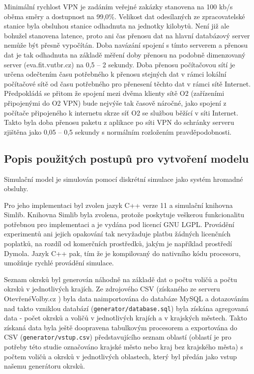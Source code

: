 \documentclass[12pt,a4paper,titlepage,final]{article}
\begin{document}
Minimální rychlost VPN je zadáním veřejné zakázky stanovena na 100 kb/s oběma směry a dostupnost na 99,0\%. \cite{ezak-czso} Velikost dat odesílaných ze zpracovatelské stanice byla obsluhou stanice odhadnuta na jednotky kilobytů. Není již ale bohužel stanovena latence, proto ani čas přenosu dat na hlavní databázový server nemůže být přesně vypočítán. Doba navázání spojení s tímto serverem a přenosu dat je tak odhadnuta na základě měření doby přenosu na podobně dimenzovaný server (eva.fit.vutbr.cz) na 0,5 -- 2 sekundy. Doba přenosu počítačovou sítí je určena odečtením času potřebného k přenosu stejných dat v rámci lokální počítačové sítě od času potřebného pro přenesení těchto dat v rámci sítě Internet. Předpokládá se přitom že spojení mezi dvěma klienty sítě O2 (zařízeními připojenými do O2 VPN) bude nejvýše tak časově náročné, jako spojení z počítače připojeného k internetu skrze síť O2 se službou běžící v síti Internet. Takto byla doba přenosu paketu z aplikace po síti VPN do schránky serveru zjištěna jako 0,05 -- 0,5 sekundy s normálním rozložením pravděpodobnosti.

\subsection{Popis použitých postupů pro vytvoření modelu}

Simulační model \cite[str. 10]{ims} je simulován pomocí diskrétní simulace \cite[str. 34]{ims} jako systém hromadné obsluhy\cite[str. 136]{ims}.

Pro jeho implementaci byl zvolen jazyk C++ verze 11 a simulační knihovna Simlib. Knihovna Simlib byla zvolena, protože poskytuje veškerou funkcionalitu potřebnou pro implementaci a je vydána pod licencí GNU LGPL. Provádění experimentů ani jejich opakování tak nevyžaduje platbu žádných licenčních poplatků, na rozdíl od komerčních prostředků, jakým je například prostředí Dymola. Jazyk C++ pak, tím že je kompilovaný do nativního kódu procesoru, umožňuje rychlé provádění simulace.

Seznam okrsků byl generován náhodně na základě dat o počtu voličů a počtu okrsků v jednotlivých krajích. Ze zdrojového CSV (získaného ze serveru OtevřenéVolby.cz \cite{otevrenevolby}) byla data naimportována do databáze MySQL a dotazováním nad takto vzniklou databází (\texttt{generator/database.sql}) byla získána agregovaná data - počet okrsků a voličů v jednotlivých krajích a v krajských městech. Takto získaná data byla ještě doopravena tabulkovým procesorem a exportována do CSV (\texttt{generator/vstup.csv}) představujícího seznam oblastí (oblastí je pro potřeby této studie označováno krajské město nebo kraj bez krajského města) s počtem voličů a okrsků v jednotlivých oblastech, který byl předán jako vstup našemu generátoru okrsků.
\end{document}
